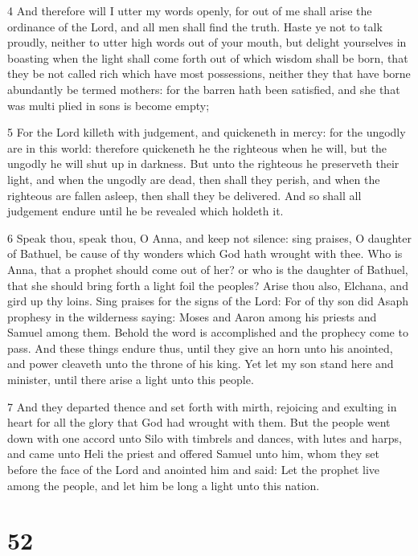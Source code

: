\par 4 And therefore will I utter my words openly, for out of me shall arise the ordinance of the Lord, and all men shall find the truth. Haste ye not to talk proudly, neither to utter high words out of your mouth, but delight yourselves in boasting when the light shall come forth out of which wisdom shall be born, that they be not called rich which have most possessions, neither they that have borne abundantly be termed mothers: for the barren hath been satisfied, and she that was multi plied in sons is become empty; 

\par 5 For the Lord killeth with judgement, and quickeneth in mercy: for the ungodly are in this world: therefore quickeneth he the righteous when he will, but the ungodly he will shut up in darkness. But unto the righteous he preserveth their light, and when the ungodly are dead, then shall they perish, and when the righteous are fallen asleep, then shall they be delivered. And so shall all judgement endure until he be revealed which holdeth it. 

\par 6 Speak thou, speak thou, O Anna, and keep not silence: sing praises, O daughter of Bathuel, be cause of thy wonders which God hath wrought with thee. Who is Anna, that a prophet should come out of her? or who is the daughter of Bathuel, that she should bring forth a light foil the peoples? Arise thou also, Elchana, and gird up thy loins. Sing praises for the signs of the Lord: For of thy son did Asaph prophesy in the wilderness saying: Moses and Aaron among his priests and Samuel among them. Behold the word is accomplished and the prophecy come to pass. And these things endure thus, until they give an horn unto his anointed, and power cleaveth unto the throne of his king. Yet let my son stand here and minister, until there arise a light unto this people.

\par 7 And they departed thence and set forth with mirth, rejoicing and exulting in heart for all the glory that God had wrought with them. But the people went down with one accord unto Silo with timbrels and dances, with lutes and harps, and came unto Heli the priest and offered Samuel unto him, whom they set before the face of the Lord and anointed him and said: Let the prophet live among the people, and let him be long a light unto this nation.

\chapter{52}

